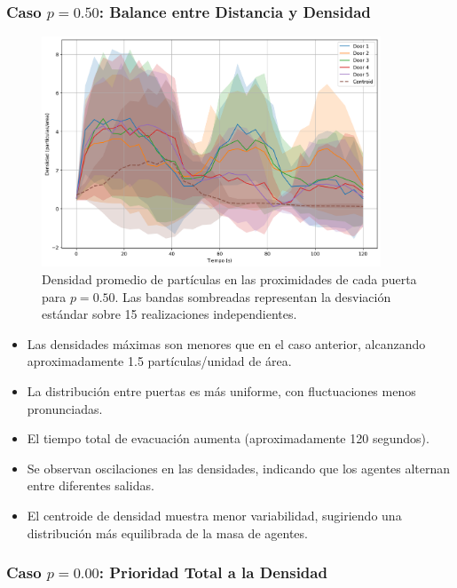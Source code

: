 \documentclass[12pt]{article}
\begin{document}
\subsubsection{Caso $p = 0.50$: Balance entre Distancia y Densidad}

\begin{figure}[H]
    \centering
    \includegraphics[width=0.9\textwidth]{img/circular_density_t_20_&_p_0.50.png}
    \caption{Densidad promedio de partículas en las proximidades de cada puerta para $p=0.50$. Las bandas sombreadas representan la desviación estándar sobre 15 realizaciones independientes.}
    \label{fig:densidad_p050}
\end{figure}

\begin{itemize}
    \item Las densidades máximas son menores que en el caso anterior, alcanzando aproximadamente 1.5 partículas/unidad de área.
    \item La distribución entre puertas es más uniforme, con fluctuaciones menos pronunciadas.
    \item El tiempo total de evacuación aumenta (aproximadamente 120 segundos).
    \item Se observan oscilaciones en las densidades, indicando que los agentes alternan entre diferentes salidas.
    \item El centroide de densidad muestra menor variabilidad, sugiriendo una distribución más equilibrada de la masa de agentes.
\end{itemize}

\subsubsection{Caso $p = 0.00$: Prioridad Total a la Densidad}
\end{document}
